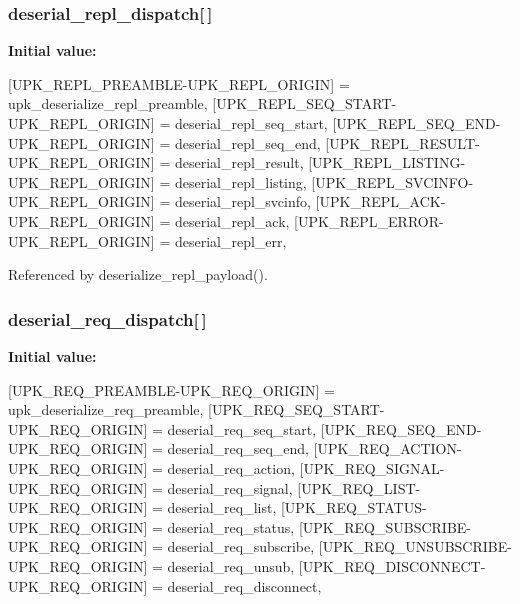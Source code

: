 \subsubsection[{deserial\_\-repl\_\-dispatch}]{ {\bf deserial\_\-repl\_\-dispatch}[$\,$]\hspace{0.3cm}{\ttfamily  [static]}}\label{upk__v0__protocol__serializer_8c_a835df861d1f4ad5654ede65cb3d41658}
{\bfseries Initial value:}
\begin{DoxyCode}
 {
    [UPK_REPL_PREAMBLE-UPK_REPL_ORIGIN] = upk_deserialize_repl_preamble,
    [UPK_REPL_SEQ_START-UPK_REPL_ORIGIN] = deserial_repl_seq_start,
    [UPK_REPL_SEQ_END-UPK_REPL_ORIGIN] = deserial_repl_seq_end,
    [UPK_REPL_RESULT-UPK_REPL_ORIGIN] = deserial_repl_result,
    [UPK_REPL_LISTING-UPK_REPL_ORIGIN] = deserial_repl_listing,
    [UPK_REPL_SVCINFO-UPK_REPL_ORIGIN] = deserial_repl_svcinfo,
    [UPK_REPL_ACK-UPK_REPL_ORIGIN] = deserial_repl_ack,
    [UPK_REPL_ERROR-UPK_REPL_ORIGIN] = deserial_repl_err,
}
\end{DoxyCode}


Referenced by deserialize\_\-repl\_\-payload().

\subsubsection[{deserial\_\-req\_\-dispatch}]{ {\bf deserial\_\-req\_\-dispatch}[$\,$]\hspace{0.3cm}{\ttfamily  [static]}}\label{upk__v0__protocol__serializer_8c_a7374e093f0fbf29244bce257767cb7d9}
{\bfseries Initial value:}
\begin{DoxyCode}
 {
    [UPK_REQ_PREAMBLE-UPK_REQ_ORIGIN] = upk_deserialize_req_preamble,
    [UPK_REQ_SEQ_START-UPK_REQ_ORIGIN] = deserial_req_seq_start,
    [UPK_REQ_SEQ_END-UPK_REQ_ORIGIN] = deserial_req_seq_end,
    [UPK_REQ_ACTION-UPK_REQ_ORIGIN] = deserial_req_action,
    [UPK_REQ_SIGNAL-UPK_REQ_ORIGIN] = deserial_req_signal,
    [UPK_REQ_LIST-UPK_REQ_ORIGIN] = deserial_req_list,
    [UPK_REQ_STATUS-UPK_REQ_ORIGIN] = deserial_req_status,
    [UPK_REQ_SUBSCRIBE-UPK_REQ_ORIGIN] = deserial_req_subscribe,
    [UPK_REQ_UNSUBSCRIBE-UPK_REQ_ORIGIN] = deserial_req_unsub,
    [UPK_REQ_DISCONNECT-UPK_REQ_ORIGIN] = deserial_req_disconnect,
}
\end{DoxyCode}


